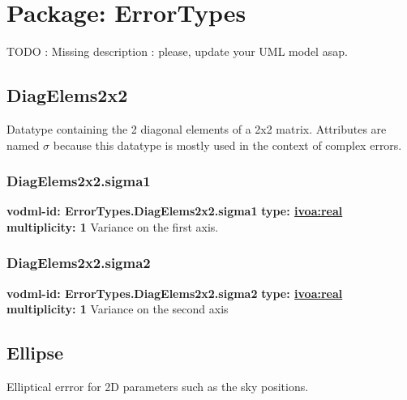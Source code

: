 {\pagebreak
\section{Package: ErrorTypes }


  TODO : Missing description : please, update your UML model asap.

  \subsection{DiagElems2x2}
  \label{sect:ErrorTypes.DiagElems2x2}
    Datatype containing the 2 diagonal elements of a 2x2 matrix. Attributes are named $\sigma$ because this datatype is mostly used in the context of complex errors.

    \subsubsection{DiagElems2x2.sigma1}
      \textbf{vodml-id: ErrorTypes.DiagElems2x2.sigma1} \newline
      \textbf{type: \hyperref[sect:ivoa]{ivoa:real}} \newline
      \textbf{multiplicity: 1} \newline 
      Variance on the first axis.

    \subsubsection{DiagElems2x2.sigma2}
      \textbf{vodml-id: ErrorTypes.DiagElems2x2.sigma2} \newline
      \textbf{type: \hyperref[sect:ivoa]{ivoa:real}} \newline
      \textbf{multiplicity: 1} \newline 
      Variance on the second axis

  \subsection{Ellipse}
  \label{sect:ErrorTypes.Ellipse}
    Elliptical errror for 2D parameters such as the sky positions.

}
